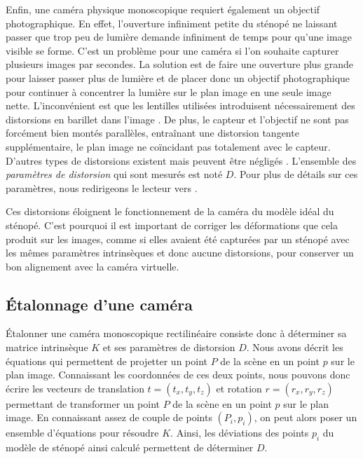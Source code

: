 Enfin, une caméra physique monoscopique requiert également un objectif photographique. En effet, l'ouverture infiniment petite du sténopé ne laissant passer que trop peu de lumière demande infiniment de temps pour qu'une image visible se forme. C'est un problème pour une caméra si l'on souhaite capturer plusieurs images par secondes. La solution est de faire une ouverture plus grande pour laisser passer plus de lumière et de placer donc un objectif photographique pour continuer à concentrer la lumière sur le plan image en une seule image nette. L'inconvénient est que les lentilles utilisées introduisent nécessairement des distorsions en barillet dans l'image . De plus, le capteur et l'objectif ne sont pas forcément bien montés parallèles, entraînant une distorsion tangente supplémentaire, le plan image ne coïncidant pas totalement avec le capteur. D'autres types de distorsions existent mais peuvent être négligés \citep[p. 377]{Bradski2008}. L'ensemble des \emph{paramètres de distorsion} qui sont mesurés est noté $D$. Pour plus de détails sur ces paramètres, nous redirigeons le lecteur vers \cite[p. 375]{Bradski2008}.


Ces distorsions éloignent le fonctionnement de la caméra du modèle idéal du sténopé. C'est pourquoi il est important de corriger les déformations que cela produit sur les images, comme si elles avaient été capturées par un sténopé avec les mêmes paramètres intrinsèques et donc aucune distorsions, pour conserver un bon alignement avec la caméra virtuelle.

\subsection{Étalonnage d'une caméra}
\label{subsec:pinhole_camera_calibration}
Étalonner une caméra monoscopique rectilinéaire consiste donc à déterminer sa matrice intrinsèque $K$ et ses paramètres de distorsion $D$. Nous avons décrit les équations qui permettent de projetter un point $P$ de la scène en un point $p$ sur le plan image. Connaissant les coordonnées de ces deux points, nous pouvons donc écrire les vecteurs de translation $t = (t_x, t_y, t_z)$ et rotation $r = (r_x, r_y, r_z)$ permettant de transformer un point $P$ de la scène en un point $p$ sur le plan image. En connaissant assez de couple de points $(P_i, p_i)$, on peut alors poser un ensemble d'équations pour résoudre $K$. Ainsi, les déviations des points $p_i$ du modèle de sténopé ainsi calculé permettent de déterminer $D$.

